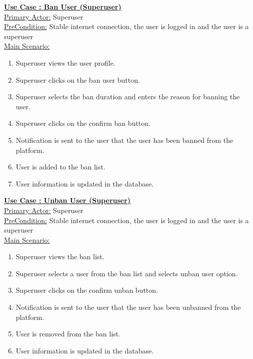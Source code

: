 \documentclass[conference,compsoc]{IEEEtran}
\newcounter{UC}
\newcommand{\nextU}{\stepcounter{UC}\theUC}
\begin{document}
\underline{\textbf{Use Case \nextU: Ban User (Superuser)}}\\

\underline{Primary Actor:} Superuser\\

\underline{PreCondition:} Stable internet connection, the user is logged in and the user is a superuser\\

\underline{Main Scenario:}\\
\begin{enumerate}
    \item Superuser views the user profile.
    \item Superuser clicks on the ban user button.
    \item Superuser selects the ban duration and enters the reason for banning the user.
    \item Superuser clicks on the confirm ban button.
    \item Notification is sent to the user that the user has been banned from the platform.
    \item User is added to the ban list.
    \item User information is updated in the database.
\end{enumerate}

\underline{\textbf{Use Case \nextU: Unban User (Superuser)}}\\

\underline{Primary Actor:} Superuser\\

\underline{PreCondition:} Stable internet connection, the user is logged in and the user is a superuser\\

\underline{Main Scenario:}\\
\begin{enumerate}
    \item Superuser views the ban list.
    \item Superuser selects a user from the ban list and selects unban user option.
    \item Superuser clicks on the confirm unban button.
    \item Notification is sent to the user that the user has been unbanned from the platform.
    \item User is removed from the ban list.
    \item User information is updated in the database.
\end{enumerate}
\end{document}
